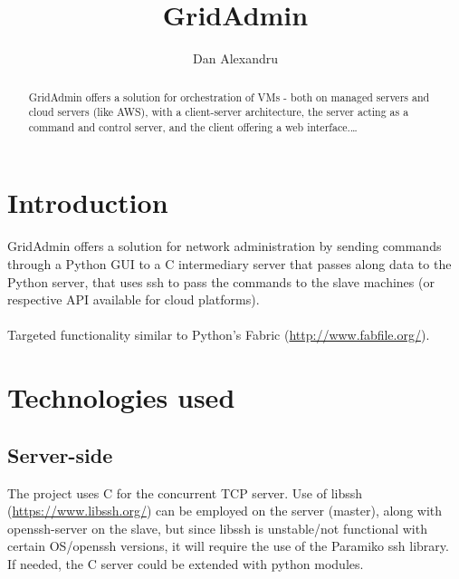 \documentclass{llncs}
\begin{document}
\title{GridAdmin}
%
\author{Dan Alexandru}
%
%
%

\maketitle              %
%


%
\begin{abstract}
GridAdmin offers a solution for orchestration of VMs - both on managed servers and cloud servers (like AWS), with a client-server architecture, the server acting as a command and control server, and the client offering a web interface.\dots
{}
\end{abstract}
%

\section{Introduction}
%
GridAdmin offers a solution for network administration by sending commands through a Python GUI to a C intermediary server that passes along data to the Python server, that uses ssh to pass the commands to the slave machines (or respective API available for cloud platforms).
\\\\
Targeted functionality similar to Python's Fabric (\url{http://www.fabfile.org/}).

%
\section{Technologies used}
%

\subsection{Server-side}

The project uses C for the concurrent TCP server. Use of libssh (\url{https://www.libssh.org/}) can be employed on the server (master), along with openssh-server on the slave, but since libssh is unstable/not functional with certain OS/openssh versions, it will require the use of the Paramiko ssh library.\\
If needed, the C server could be extended with python modules.
\end{document}

